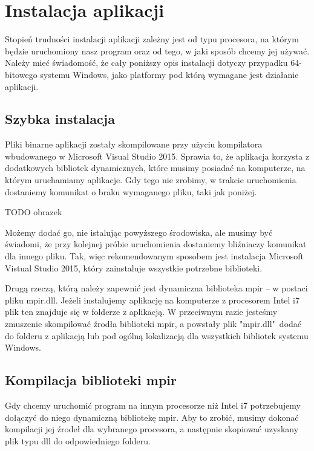 \section{Instalacja aplikacji}

Stopień trudności instalacji aplikacji zależny jest od typu procesora, na którym będzie uruchomiony nasz program oraz od tego, w jaki sposób chcemy jej używać. Należy mieć świadomość, że cały poniższy opis instalacji dotyczy przypadku 64-bitowego systemu Windows, jako platformy pod którą wymagane jest działanie aplikacji.

\subsection{Szybka instalacja}

Pliki binarne aplikacji zostały skompilowane przy użyciu kompilatora wbudowanego w Microsoft Visual Studio 2015. Sprawia to, że aplikacja korzysta z dodatkowych bibliotek dynamicznych, które musimy posiadać na komputerze, na którym uruchamiamy aplikacje. Gdy tego nie zrobimy, w trakcie uruchomienia dostaniemy komunikat o braku wymaganego pliku, taki jak poniżej.

TODO obrazek

Możemy dodać go, nie istalując powyższego środowiska, ale musimy być świadomi, że przy kolejnej próbie uruchomienia dostaniemy bliźniaczy komunikat dla innego pliku. Tak, więc rekomendowanym sposobem jest instalacja Microsoft Vistual Studio 2015, który zainstaluje wszystkie potrzebne biblioteki.

Drugą rzeczą, którą należy zapewnić jest dynamiczna biblioteka mpir -- w postaci pliku mpir.dll. Jeżeli instalujemy aplikację na komputerze z procesorem Intel i7 plik ten znajduje się w folderze z aplikacją. W przeciwnym razie jesteśmy zmuszenie skompilować źrodła biblioteki mpir, a powstały plik "mpir.dll"\ dodać do folderu z aplikacją lub pod ogólną lokalizacją dla wszystkich bibliotek systemu Windows.

\subsection{Kompilacja biblioteki mpir}

Gdy chcemy uruchomić program na innym procesorze niż Intel i7 potrzebujemy dołączyć do niego dynamiczną bibliotekę mpir. Aby to zrobić, musimy dokonać kompilacji jej źrodeł dla wybranego procesora, a następnie skopiować uzyskany plik typu dll do odpowiedniego folderu.

